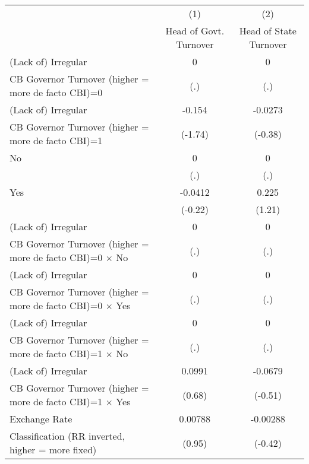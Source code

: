{
\def\sym#1{\ifmmode^{#1}\else\(^{#1}\)\fi}
\begin{tabular}{l*{2}{c}}
\hline\hline
                    &\multicolumn{1}{c}{(1)}&\multicolumn{1}{c}{(2)}\\
                    &\multicolumn{1}{c}{Head of Govt. Turnover}&\multicolumn{1}{c}{Head of State Turnover}\\
\hline
(Lack of) Irregular &           0         &           0         \\
CB Governor Turnover (higher = more de facto CBI)=0&         (.)         &         (.)         \\
[1em]
(Lack of) Irregular &      -0.154         &     -0.0273         \\
CB Governor Turnover (higher = more de facto CBI)=1&     (-1.74)         &     (-0.38)         \\
[1em]
No                  &           0         &           0         \\
                    &         (.)         &         (.)         \\
[1em]
Yes                 &     -0.0412         &       0.225         \\
                    &     (-0.22)         &      (1.21)         \\
[1em]
(Lack of) Irregular &           0         &           0         \\
CB Governor Turnover (higher = more de facto CBI)=0 $\times$ No&         (.)         &         (.)         \\
[1em]
(Lack of) Irregular &           0         &           0         \\
CB Governor Turnover (higher = more de facto CBI)=0 $\times$ Yes&         (.)         &         (.)         \\
[1em]
(Lack of) Irregular &           0         &           0         \\
CB Governor Turnover (higher = more de facto CBI)=1 $\times$ No&         (.)         &         (.)         \\
[1em]
(Lack of) Irregular &      0.0991         &     -0.0679         \\
CB Governor Turnover (higher = more de facto CBI)=1 $\times$ Yes&      (0.68)         &     (-0.51)         \\
[1em]
Exchange Rate       &     0.00788         &    -0.00288         \\
Classification (RR inverted, higher = more fixed)&      (0.95)         &     (-0.42)         \\

\end{tabular}}
